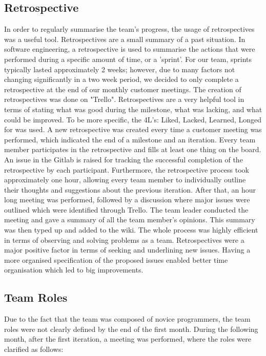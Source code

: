 \documentclass{l3proj}
\begin{document}
\subsection{Retrospective}
\label{retrospective}

In order to regularly summarise the team's progress, the usage of retrospectives was a useful tool. Retrospectives are a small summary of a past situation. In software engineering, a retrospective is used to summarise the actions that were performed during a specific amount of time, or a 'sprint'. For our team, sprints typically lasted approximately 2 weeks; however, due to many factors not changing significantly in a two week period, we decided to only complete a retrospective at the end of our monthly customer meetings. The creation of retrospectives was done on "Trello". Retrospectives are a very helpful tool in terms of stating what was good during the milestone, what was lacking, and what could be improved. To be more specific, the 4L's: Liked, Lacked, Learned, Longed for was used. A new retrospective was created every time a customer meeting was performed, which indicated the end of a milestone and an iteration. Every team member participates in the retrospective and fills at least one thing on the board. An issue in the Gitlab is raised for tracking the successful completion of the retrospective by each participant. Furthermore, the retrospective process took approximately one hour, allowing every team member to individually outline their thoughts and suggestions about the previous iteration. After that, an hour long meeting was performed, followed by a discussion where major issues were outlined which were identified through Trello. The team leader conducted the meeting and gave a summary of all the team member's opinions. This summary was then typed up and added to the wiki. The whole process was highly efficient in terms of observing and solving problems as a team. Retrospectives were a major positive factor in terms of seeking and underlining new issues. Having a more organised specification of the proposed issues enabled better time organisation which led to big improvements.

\subsection{Team Roles}
\label{roles}

Due to the fact that the team was composed of novice programmers, the team roles were not clearly defined by the end of the first month. During the following month, after the first iteration, a meeting was performed, where the roles were clarified as follows:
\end{document}
